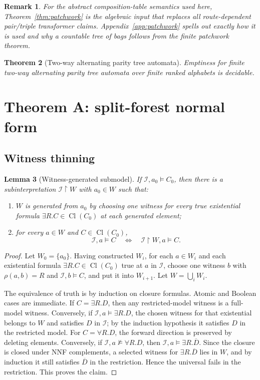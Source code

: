 \documentclass[11pt]{article}
\newtheorem{theorem}{Theorem}[section]
\newtheorem{lemma}[theorem]{Lemma}
\newtheorem{remark}[theorem]{Remark}
\newcommand{\Cl}{\operatorname{Cl}}
\newcommand{\calI}{\mathcal I}
\begin{document}
\begin{remark}
For the abstract composition-table semantics used here, Theorem~\ref{thm:patchwork} is the algebraic input that replaces all route-dependent pair/triple transformer claims.  Appendix~\ref{app:patchwork} spells out exactly how it is used and why a countable tree of bags follows from the finite patchwork theorem.
\end{remark}

\begin{theorem}[Two-way alternating parity tree automata]
Emptiness for finite two-way alternating parity tree automata over finite ranked alphabets is decidable.
\end{theorem}

\section{Theorem A: split-forest normal form}

\subsection{Witness thinning}

\begin{lemma}[Witness-generated submodel]\label{lem:thinning}
If $\calI,a_0\models C_0$, then there is a subinterpretation $\calI\upharpoonright W$ with $a_0\in W$ such that:
\begin{enumerate}[label=(\roman*)]
\item $W$ is generated from $a_0$ by choosing one witness for every true existential formula $\exists R.C\in\Cl(C_0)$ at each generated element;
\item for every $a\in W$ and $C\in\Cl(C_0)$,
\[
\calI,a\models C\quad\Longleftrightarrow\quad \calI\upharpoonright W,a\models C.
\]
\end{enumerate}
\end{lemma}

\begin{proof}
Let $W_0=\{a_0\}$.  Having constructed $W_i$, for each $a\in W_i$ and each existential formula $\exists R.C\in\Cl(C_0)$ true at $a$ in $\calI$, choose one witness $b$ with $\rho(a,b)=R$ and $\calI,b\models C$, and put it into $W_{i+1}$.  Let $W=\bigcup_iW_i$.

The equivalence of truth is by induction on closure formulas.  Atomic and Boolean cases are immediate.  If $C=\exists R.D$, then any restricted-model witness is a full-model witness.  Conversely, if $\calI,a\models\exists R.D$, the chosen witness for that existential belongs to $W$ and satisfies $D$ in $\calI$; by the induction hypothesis it satisfies $D$ in the restricted model.  For $C=\forall R.D$, the forward direction is preserved by deleting elements.  Conversely, if $\calI,a\not\models\forall R.D$, then $\calI,a\models\exists R.\overline D$.  Since the closure is closed under NNF complements, a selected witness for $\exists R.\overline D$ lies in $W$, and by induction it still satisfies $\overline D$ in the restriction.  Hence the universal fails in the restriction.  This proves the claim.
\end{proof}
\end{document}
